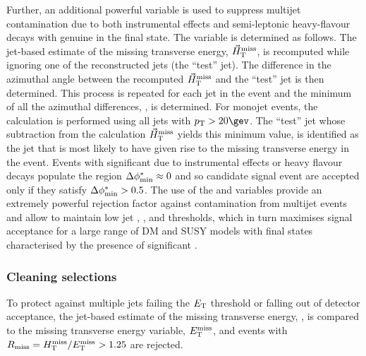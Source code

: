 \subsubsection*{\bdphi}

Further, an additional powerful variable \bdphi is used to suppress multijet contamination due to both instrumental effects and semi-leptonic heavy-flavour decays with genuine \met in the final state. The variable is determined as follows. The jet-based estimate of the missing transverse energy, ${\mbox{$\vec{H}_{\rm T}^{\rm miss}$}}$, is recomputed while ignoring one of the reconstructed jets (the ``test'' jet). The
difference in the azimuthal angle between the recomputed $\mbox{$\vec{H}_{\rm T}^{\rm miss}$}$ and the ``test'' jet is then determined. This process is repeated for each jet in the event and the minimum of all the azimuthal differences, \bdphi, is determined. For monojet events, the calculation is 
performed using all jets with $\Pt > 20\gev$. The ``test'' jet whose subtraction from the calculation $\mbox{$\vec{H}_{\rm T}^{\rm miss}$}$ yields this minimum value, is
identified as the jet that is most likely to have given rise to the missing transverse energy in the event. Events with significant \mht
due to instrumental effects or heavy flavour decays populate the region $\mbox{$\Delta\phi^{*}_{\rm min}$} \approx 0$ and so candidate signal event are accepted
only if they satisfy $\mbox{$\Delta\phi^{*}_{\rm min}$} > 0.5$. The use of the \bdphi and \alphat variables provide an extremely powerful rejection factor against
contamination from multijet events and allow to maintain low jet \PT, \HT, and \mht thresholds, which in turn maximises signal acceptance
for a large range of DM and SUSY models with final states characterised by the presence of significant \met.


\subsubsection*{Cleaning selections}
To protect against multiple jets failing the ${E_{\text T}}$ threshold or falling out of detector acceptance, the jet-based estimate of the missing transverse energy, \mht, is compared to the missing transverse energy variable, $\mbox{$E_\text{T}^{\rm miss}$}$, and events with $R_{\rm
  miss}=\mbox{$H_{\rm T}^{\rm miss}$}/\mbox{$E_\text{T}^{\rm miss}$} > 1.25$ are rejected. 
  

